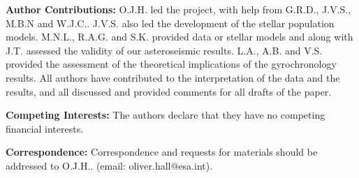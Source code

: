 \documentclass[12pt]{article}
\begin{document}
\textbf{Author Contributions:} O.J.H. led the project, with help from G.R.D., J.V.S., M.B.N and W.J.C.. J.V.S. also led the development of the stellar population models. M.N.L., R.A.G. and S.K. provided data or stellar models and along with J.T. assessed the validity of our asteroseismic results. L.A., A.B. and V.S. provided the assessment of the theoretical implications of the gyrochronology results. All authors have contributed to the interpretation of the data and the results, and all discussed and provided comments for all drafts of the paper.

\textbf{Competing Interests:} The authors declare that they have no competing financial interests.

\textbf{Correspondence:} Correspondence and requests for materials should be addressed to O.J.H.. (email: oliver.hall@esa.int).\\

\clearpage


\clearpage

\end{document}
